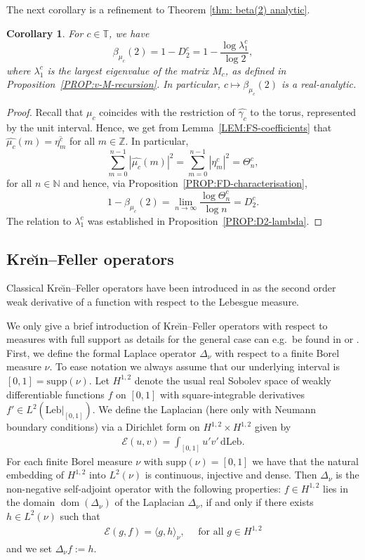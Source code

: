 \documentclass[11pt,reqno]{amsart}
\theoremstyle{plain}
\newtheorem{coro}[theorem]{Corollary}
\theoremstyle{definition}
\newcommand{\Z}{{\mathbb Z}}
\newcommand{\N}{{\mathbb N}}
\newcommand{\T}{{\mathbb T}}
\newcommand{\dom}{\operatorname{dom}}
\newcommand{\dd}{\,\mathrm{d}}
\newcommand{\supp}{\mathrm{supp}}
\begin{document}
The next corollary is a refinement to Theorem \ref{thm: beta(2) analytic}.
\begin{coro}
\label{COR:fourier-correlation}
For  $c\in \T$, we have
\[
\beta_{\mu_{c}}(2) = 1 - {D_2^c} = 1 - \frac{\log \lambda_1^{c}}{\log 2},
\]
where $\lambda_1^{c}$ is the largest eigenvalue of the matrix $M_{c}$, as defined in Proposition~\ref{PROP:v-M-recursion}. In particular, $c\mapsto \beta_{\mu_{c}}(2)$ is a real-analytic.
\end{coro}

\begin{proof}
Recall that $\mu_c$ coincides with the restriction of $\widehat{\gamma_c}$ to the torus, represented by the unit interval. Hence, we get from Lemma~\ref{LEM:FS-coefficients} that $\widehat{\mu_c}(m) = \overline{\eta^c_m}$ for all $m \in \Z$. In particular,
\[
\sum_{m=0}^{n-1} |\widehat{\mu_c}(m)|^2 = \sum_{m=0}^{n-1} |\eta_m^{c}|^2 = \Theta_n^c,
\]
for all $n \in \N$ and hence, via Proposition~\ref{PROP:FD-characterisation},
\[
1- \beta_{\mu_c}(2) = \lim_{n \to \infty} \frac{\log  \Theta_n^c}{\log n} = D_2^{c}.
\]
The relation to $\lambda_1^{c}$ was established in Proposition~\ref{PROP:D2-lambda}.
\end{proof}



\subsection{Kre\u{\i}n--Feller operators}
Classical Kre\u{\i}n--Feller operators have been introduced in 
\cite{kreinKFop, kackreinKFop, feller_KFop} as the second order weak derivative of a function with respect to the Lebesgue measure. 

We only  give a brief  introduction of Kre\u{\i}n--Feller operators with respect to  measures with full support as details for the general case can e.g.\ be found  in  \cite[Sec.~2.1]{KessNie} or \cite{KNSW}.
First, we define the formal Laplace operator $\Delta_{\nu}$ with respect to a finite Borel measure $\nu$. 
To ease notation we always assume that our underlying interval is $[0,1]=\supp(\nu)$. 
Let $H^{1,2}$ denote the usual real Sobolev space of weakly differentiable functions $f$ on $[0,1]$ with square-integrable derivatives $f'\in L^{2}(\mathrm{Leb}|_{[0,1]})$. 
 We define the Laplacian (here only with Neumann boundary conditions) via a Dirichlet form  on $H^{1,2} \times H^{1,2} $ given by
 \begin{align*}
 \mathcal{E}(u, v)  
=\int_{[0,1]}u' v' \dd \mathrm{Leb}.
\end{align*}
 For each finite Borel measure    $\nu$  with  $\supp(\nu)=[0,1]$ we have that the natural embedding of $H^{1,2} $ into $L^{2}(\nu)$ is continuous, injective and dense.
Then $\Delta_{\nu}$ is the non-negative self-adjoint operator with the following properties: 
$f \in H^{1,2}$ lies in the domain $\dom(\Delta_{\nu})$ of the Laplacian $\Delta_{\nu}$, if and only if there exists $h \in L^2(\nu)$ such that
\begin{align*}
 \mathcal{E} (g,f)= \langle g, h\rangle_{\nu},\quad \text{ for all } g \in H^{1,2}
\end{align*}
and we set $\Delta_{\nu} f:=h$.
\end{document}

